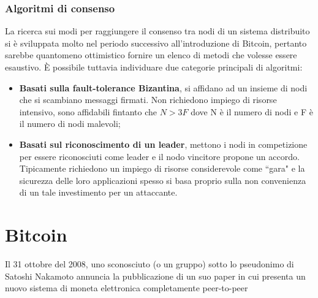		\subsubsection{Algoritmi di consenso}
			La ricerca sui modi per raggiungere il consenso tra nodi di un sistema distribuito si è sviluppata molto nel periodo successivo all'introduzione di Bitcoin, pertanto sarebbe quantomeno ottimistico fornire un elenco di metodi che volesse essere esaustivo. È possibile tuttavia individuare due categorie principali di algoritmi:
			\begin{itemize}
				\item \textbf{Basati sulla fault-tolerance Bizantina}, si affidano ad un insieme di nodi che si scambiano messaggi firmati. Non richiedono impiego di risorse intensivo, sono affidabili fintanto che $N > 3F$ dove N è il numero di nodi e F è il numero di nodi malevoli;
				\item \textbf{Basati sul riconoscimento di un leader}, mettono i nodi in competizione per essere riconosciuti come leader e il nodo vincitore propone un accordo. Tipicamente richiedono un impiego di risorse considerevole come ``gara" e la sicurezza delle loro applicazioni spesso si basa proprio sulla non convenienza di un tale investimento per un attaccante.
			\end{itemize}

\section{Bitcoin}
	Il 31 ottobre del 2008, uno sconosciuto (o un gruppo) sotto lo pseudonimo di Satoshi Nakamoto annuncia la pubblicazione di un suo paper \cite{nakamoto_bitcoin} in cui presenta un nuovo sistema di moneta elettronica completamente peer-to-peer